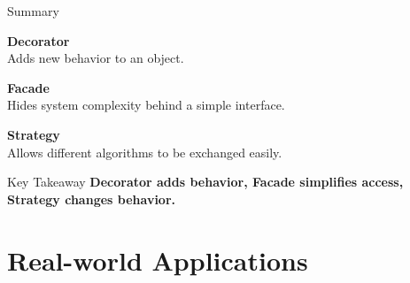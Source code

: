 \documentclass[aspectratio=169]{beamer}
\begin{document}
\begin{frame}{Summary}

\begin{center}

\vspace{0.5cm}

\Large
\textbf{Decorator}
\\
\large
Adds new behavior to an object.

\vspace{0.5cm}

\textbf{Facade}
\\
\large
Hides system complexity behind a simple interface.

\vspace{0.5cm}

\textbf{Strategy}
\\
\large
Allows different algorithms to be exchanged easily.

\vspace{0.8cm}

\begin{block}{Key Takeaway}
\centering
\textbf{
Decorator adds behavior,
Facade simplifies access,
Strategy changes behavior.
}
\end{block}

\end{center}

\end{frame}

\section{Real-world Applications}

\end{document}

